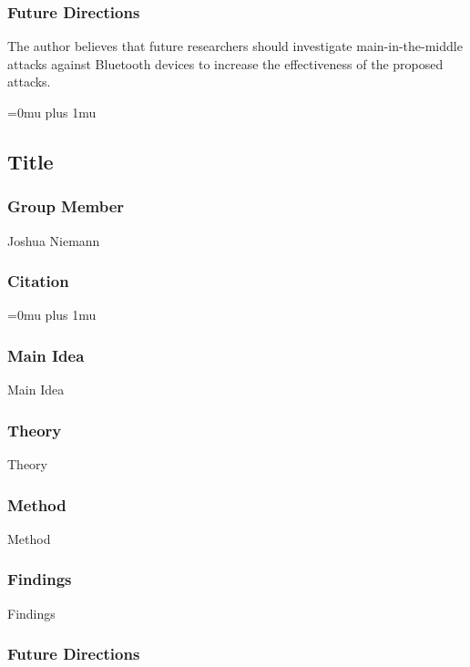 \subsubsection{Future Directions}

\noindent
The author believes that future researchers should investigate main-in-the-middle attacks against Bluetooth devices to increase the effectiveness of the proposed attacks. 

\Urlmuskip=0mu plus 1mu\relax

\noindent
\subsection{Title}

\subsubsection{Group Member}

\noindent
Joshua Niemann

\noindent
\subsubsection{Citation}

\Urlmuskip=0mu plus 1mu\relax

\subsubsection{Main Idea}

\noindent
Main Idea

\subsubsection{Theory}

\noindent
Theory

\subsubsection{Method}

\noindent
Method

\subsubsection{Findings}

\noindent
Findings

\subsubsection{Future Directions}

